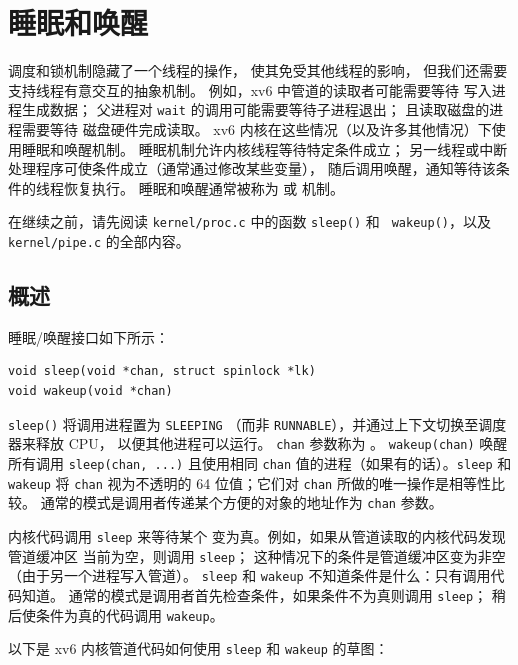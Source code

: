 \chapter{睡眠和唤醒}
\label{CH:SLEEP}

调度和锁机制隐藏了一个线程的操作，
使其免受其他线程的影响，
但我们还需要支持线程有意交互的抽象机制。
例如，xv6 中管道的读取者可能需要等待
写入进程生成数据；
父进程对 \lstinline{wait} 的调用可能需要等待子进程退出；
且读取磁盘的进程需要等待
磁盘硬件完成读取。
xv6 内核在这些情况（以及许多其他情况）下使用睡眠和唤醒机制。
睡眠机制允许内核线程等待特定条件成立；
另一线程或中断处理程序可使条件成立（通常通过修改某些变量），
随后调用唤醒，通知等待该条件的线程恢复执行。
睡眠和唤醒通常被称为
或
机制。

在继续之前，请先阅读 {\tt kernel/proc.c} 中的函数 {\tt sleep()} 和 {\tt
  wakeup()}，以及 {\tt kernel/pipe.c} 的全部内容。

\section{概述}

睡眠/唤醒接口如下所示：

\begin{lstlisting}
void sleep(void *chan, struct spinlock *lk)
void wakeup(void *chan)
\end{lstlisting}

\lstinline{sleep()} 将调用进程置为 \lstinline{SLEEPING}
（而非 \lstinline{RUNNABLE}），并通过上下文切换至调度器来释放 CPU，
以便其他进程可以运行。
\lstinline{chan} 参数称为 。
\lstinline{wakeup(chan)} 唤醒所有调用 \lstinline{sleep(chan, ...)} 且使用相同 \lstinline{chan}
值的进程（如果有的话）。\lstinline{sleep} 和 \lstinline{wakeup} 将 \lstinline{chan}
视为不透明的 64 位值；它们对 \lstinline{chan} 所做的唯一操作是相等性比较。
通常的模式是调用者传递某个方便的对象的地址作为 \lstinline{chan} 参数。

内核代码调用 \lstinline{sleep} 来等待某个
变为真。例如，如果从管道读取的内核代码发现管道缓冲区
当前为空，则调用 \lstinline{sleep}；
这种情况下的条件是管道缓冲区变为非空（由于另一个进程写入管道）。
\lstinline{sleep} 和 \lstinline{wakeup} 不知道条件是什么：只有调用代码知道。
通常的模式是调用者首先检查条件，如果条件不为真则调用 \lstinline{sleep}；
稍后使条件为真的代码调用 \lstinline{wakeup}。

以下是 xv6 内核管道代码如何使用
\lstinline{sleep} 和 \lstinline{wakeup} 的草图：

